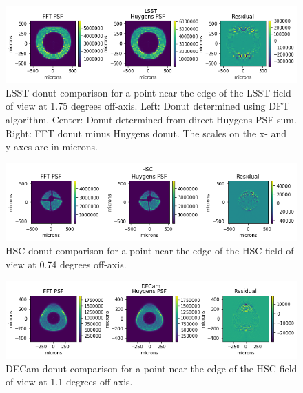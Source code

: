 \documentclass{article}
\begin{document}
\begin{figure}
    \includegraphics[scale=0.7]{LSST_donut_comparison.png}

    \caption{LSST donut comparison for a point near the edge of the LSST field of view at 1.75
    degrees off-axis.  Left: Donut determined using DFT algorithm.  Center: Donut determined from
    direct Huygens PSF sum.  Right: FFT donut minus Huygens donut.  The scales on the x- and y-axes
    are in microns. }

    \label{fig:LSST_donut_comparison}
\end{figure}

\begin{figure}
    \includegraphics[scale=0.7]{HSC_donut_comparison.png}

    \caption{HSC donut comparison for a point near the edge of the HSC field of view at 0.74 degrees
    off-axis.}

    \label{fig:HSC_donut_comparison}
\end{figure}

\begin{figure}
    \includegraphics[scale=0.7]{DECam_donut_comparison.png}

    \caption{DECam donut comparison for a point near the edge of the HSC field of view at 1.1 degrees
    off-axis.}

    \label{fig:DECam_donut_comparison}
\end{figure}
\end{document}
